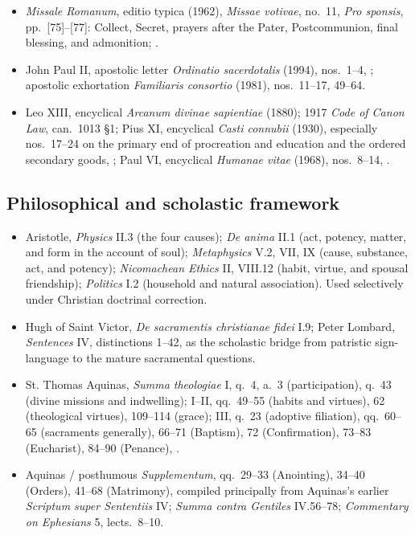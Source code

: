 {\begin{itemize}[itemsep=0.18em,topsep=0.25em]
\item \emph{Missale Romanum}, editio typica (1962), \emph{Missae votivae}, no.~11, \emph{Pro sponsis}, pp.~[75]--[77]: Collect, Secret, prayers after the Pater, Postcommunion, final blessing, and admonition; .
\item John Paul II, apostolic letter \emph{Ordinatio sacerdotalis} (1994), nos.~1--4, ; apostolic exhortation \emph{Familiaris consortio} (1981), nos.~11--17, 49--64.
\item Leo XIII, encyclical \emph{Arcanum divinae sapientiae} (1880); 1917 \emph{Code of Canon Law}, can.~1013 \S1; Pius XI, encyclical \emph{Casti connubii} (1930), especially nos.~17--24 on the primary end of procreation and education and the ordered secondary goods, ; Paul VI, encyclical \emph{Humanae vitae} (1968), nos.~8--14, .
\end{itemize}
}

\subsection*{Philosophical and scholastic framework}
{\footnotesize
\begin{itemize}[itemsep=0.18em,topsep=0.25em]
\item Aristotle, \emph{Physics} II.3 (the four causes); \emph{De anima} II.1 (act, potency, matter, and form in the account of soul); \emph{Metaphysics} V.2, VII, IX (cause, substance, act, and potency); \emph{Nicomachean Ethics} II, VIII.12 (habit, virtue, and spousal friendship); \emph{Politics} I.2 (household and natural association). Used selectively under Christian doctrinal correction.
\item Hugh of Saint Victor, \emph{De sacramentis christianae fidei} I.9; Peter Lombard, \emph{Sentences} IV, distinctions 1--42, as the scholastic bridge from patristic sign-language to the mature sacramental questions.
\item St. Thomas Aquinas, \emph{Summa theologiae} I, q.~4, a.~3 (participation), q.~43 (divine missions and indwelling); I--II, qq.~49--55 (habits and virtues), 62 (theological virtues), 109--114 (grace); III, q.~23 (adoptive filiation), qq.~60--65 (sacraments generally), 66--71 (Baptism), 72 (Confirmation), 73--83 (Eucharist), 84--90 (Penance), .
\item Aquinas / posthumous \emph{Supplementum}, qq.~29--33 (Anointing), 34--40 (Orders), 41--68 (Matrimony), compiled principally from Aquinas's earlier \emph{Scriptum super Sententiis} IV; \emph{Summa contra Gentiles} IV.56--78; \emph{Commentary on Ephesians} 5, lects.~8--10.
\end{itemize}
}

